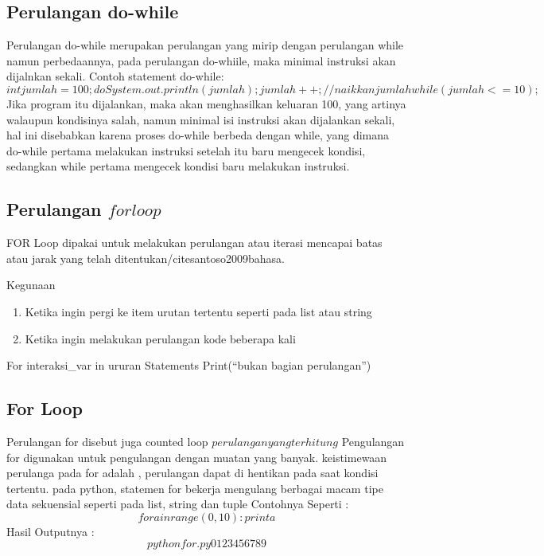 \subsection{Perulangan do-while}
Perulangan do-while merupakan perulangan yang  mirip dengan perulangan while namun perbedaannya\cite{arfian2012rekayasa}, pada perulangan do-whiile, maka minimal instruksi akan dijalnkan sekali. Contoh statement do-while:
\begin{equation}
int jumlah = 100;
do{
    System.out.println(jumlah);
    jumlah++; // naikkan jumlah
}while(jumlah <= 10);
\end{equation}
Jika program itu dijalankan, maka akan menghasilkan keluaran 100,  yang artinya walaupun kondisinya salah, namun minimal isi instruksi akan dijalankan sekali, hal ini disebabkan karena proses do-while berbeda dengan while,  yang dimana do-while pertama melakukan instruksi setelah itu baru mengecek kondisi, sedangkan while pertama mengecek kondisi baru melakukan instruksi. 

\subsection{Perulangan \(for loop\)}
FOR Loop dipakai untuk melakukan perulangan atau iterasi mencapai batas atau jarak yang telah ditentukan/cite{santoso2009bahasa}.

Kegunaan
\begin{enumerate}
\item Ketika ingin pergi ke item urutan tertentu seperti pada list atau string
\item Ketika ingin melakukan perulangan kode beberapa kali
\end{enumerate}
For interaksi_var in ururan
Statements
Print(“bukan bagian perulangan”) 

\subsection{For Loop}
Perulangan for disebut juga counted loop \(perulangan yang terhitung\)
Pengulangan for digunakan untuk pengulangan dengan muatan yang banyak\cite{van2007python}.
keistimewaan perulanga pada for adalah , perulangan dapat di hentikan pada saat kondisi tertentu. pada python, statemen for bekerja mengulang berbagai macam tipe data sekuensial seperti pada list, string dan tuple
Contohnya Seperti :
\begin{equation}
for a in range(0, 10):
	print a
\end{equation}
Hasil Outputnya :
\begin{equation}
python for.py
0
1
2
3
4
5
6
7
8
9
\end{equation}


